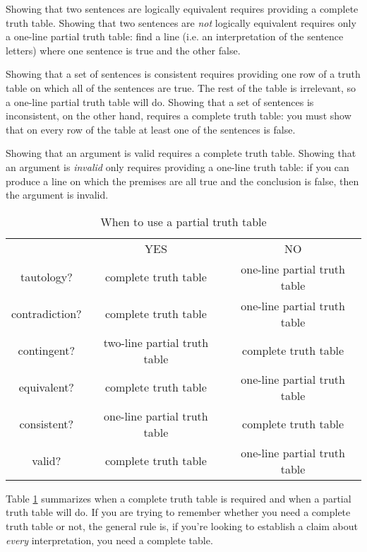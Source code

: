 Showing that two sentences are logically equivalent requires providing a complete truth table.
Showing that two sentences are \emph{not} logically equivalent requires only a one-line partial truth table: find a line (i.e. an interpretation of the sentence letters) where one sentence is true and the other false.

Showing that a set of sentences is consistent requires providing one row of a truth table on which all of the sentences are true.
The rest of the table is irrelevant, so a one-line partial truth table will do.
Showing that a set of sentences is inconsistent, on the other hand, requires a complete truth table: you must show that on every row of the table at least one of the sentences is false.

Showing that an argument is valid requires a complete truth table.
Showing that an argument is \emph{invalid} only requires providing a one-line truth table: if you can produce a line on which the premises are all true and the conclusion is false, then the argument is invalid.

\begin{table}[ht]
\begin{center}
\begin{tabular}{c|c|c|}
\cline{2-3}
 & YES & NO\\
\cline{2-3}
tautology? & complete truth table & one-line partial truth table\\
contradiction? &  complete truth table  & one-line partial truth table\\
contingent? & two-line partial truth table & complete truth table\\
equivalent? & complete truth table & one-line partial truth table\\
consistent? & one-line partial truth table & complete truth table\\
valid? & complete truth table & one-line partial truth table\\
\cline{2-3}
\end{tabular}
\end{center}
\caption{When to use a partial truth table}
\label{table.CompleteVsPartial}
\end{table}

Table \ref{table.CompleteVsPartial} summarizes when a complete truth table is required and when a partial truth table will do.
If you are trying to remember whether you need a complete truth table or not, the general rule is, if you're looking to establish a claim about \emph{every} interpretation, you need a complete table.




